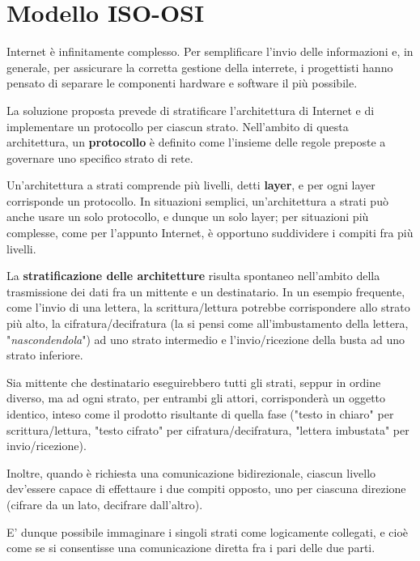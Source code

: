 \section{Modello ISO-OSI}

Internet è infinitamente complesso. Per semplificare l'invio delle informazioni e, in generale, per assicurare la corretta gestione della interrete, i progettisti hanno pensato di separare le componenti hardware e software il più possibile.

\vspace{3mm}

La soluzione proposta prevede di stratificare l'architettura di Internet e di implementare un protocollo per ciascun strato. Nell'ambito di questa architettura, un \textbf{protocollo} è definito come l'insieme delle regole preposte a governare uno specifico strato di rete.

\vspace{3mm}

Un'architettura a strati comprende più livelli, detti \textbf{layer}, e per ogni layer corrisponde un protocollo. In situazioni semplici, un'architettura a strati può anche usare un solo protocollo, e dunque un solo layer; per situazioni più complesse, come per l'appunto Internet, è opportuno suddividere i compiti fra più livelli.

La \textbf{stratificazione delle architetture} risulta spontaneo nell'ambito della trasmissione dei dati fra un mittente e un destinatario. In un esempio frequente, come l'invio di una lettera, la scrittura/lettura potrebbe corrispondere allo strato più alto, la cifratura/decifratura (la si pensi come all'imbustamento della lettera, "\textit{nascondendola}") ad uno strato intermedio e l'invio/ricezione della busta ad uno strato inferiore. 

Sia mittente che destinatario eseguirebbero tutti gli strati, seppur in ordine diverso, ma ad ogni strato, per entrambi gli attori, corrisponderà un oggetto identico, inteso come il prodotto risultante di quella fase ("testo in chiaro" per scrittura/lettura, "testo cifrato" per cifratura/decifratura, "lettera imbustata" per invio/ricezione).

Inoltre, quando è richiesta una comunicazione bidirezionale, ciascun livello dev'essere capace di effettaure i due compiti opposto, uno per ciascuna direzione (cifrare da un lato, decifrare dall'altro).

E' dunque possibile immaginare i singoli strati come logicamente collegati, e cioè come se si consentisse una comunicazione diretta fra i pari delle due parti.

